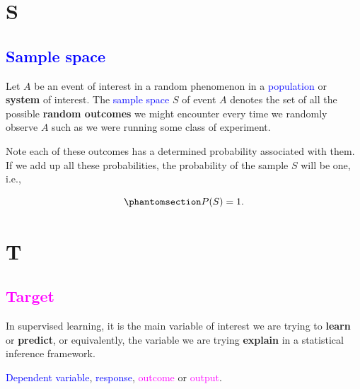 \documentclass[
  letterpaper,
  DIV=11,
  numbers=noendperiod]{scrreprt}
\begin{document}
\section*{S}\label{s}


\subsection*{\texorpdfstring{\textcolor{blue}{Sample space}}{}}\label{section-9}

Let \(A\) be an event of interest in a random phenomenon in a
\textcolor{blue}{population} or \textbf{system} of interest. The
\textcolor{blue}{sample space} \(S\) of event \(A\) denotes the set of
all the possible \textbf{random outcomes} we might encounter every time
we randomly observe \(A\) such as we were running some class of
experiment.

Note each of these outcomes has a determined probability associated with
them. If we add up all these probabilities, the probability of the
sample \(S\) will be one, i.e.,

\begin{equation}\phantomsection\label{eq-sample-space}{
P(S) = 1.
}\end{equation}

\section*{T}\label{t}


\subsection*{\texorpdfstring{\textcolor{magenta}{Target}}{}}\label{section-10}

In supervised learning, it is the main variable of interest we are
trying to \textbf{learn} or \textbf{predict}, or equivalently, the
variable we are trying \textbf{explain} in a statistical inference
framework.

\begin{tcolorbox}[enhanced jigsaw, bottomrule=.15mm, breakable, colback=white, leftrule=.75mm, coltitle=black, rightrule=.15mm, bottomtitle=1mm, title=\textcolor{quarto-callout-warning-color}{\faExclamationTriangle}\hspace{0.5em}{Equivalent to:}, opacitybacktitle=0.6, toprule=.15mm, titlerule=0mm, arc=.35mm, colbacktitle=quarto-callout-warning-color!10!white, toptitle=1mm, colframe=quarto-callout-warning-color-frame, left=2mm, opacityback=0]

\textcolor{blue}{Dependent variable}, \textcolor{blue}{response},
\textcolor{magenta}{outcome} or \textcolor{magenta}{output}.

\end{tcolorbox}
\end{document}
